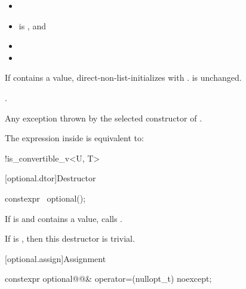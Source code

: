 \begin{itemdescr}
\pnum
\constraints
\begin{itemize}
\item {}\added{,}
\item {} is , and
\item {}\removed{, }
\item {}
\end{itemize}

\pnum
\effects
If  contains a value, direct-non-list-initializes  with .  is unchanged.

\pnum
\ensures
{}.

\pnum
\throws
Any exception thrown by the selected constructor of .

\pnum
\remarks
The expression inside  is equivalent to:
\begin{codeblock}
!is_convertible_v<U, T>
\end{codeblock}
\end{itemdescr}

[optional.dtor]{Destructor}

%
\begin{itemdecl}
constexpr ~optional();
\end{itemdecl}

\begin{itemdescr}
\pnum
\effects
If  is  and  contains a value, calls .

\pnum
\remarks
If  is , then this destructor is trivial.
\end{itemdescr}

[optional.assign]{Assignment}

%
\begin{itemdecl}
constexpr optional@@& operator=(nullopt_t) noexcept;
\end{itemdecl}

